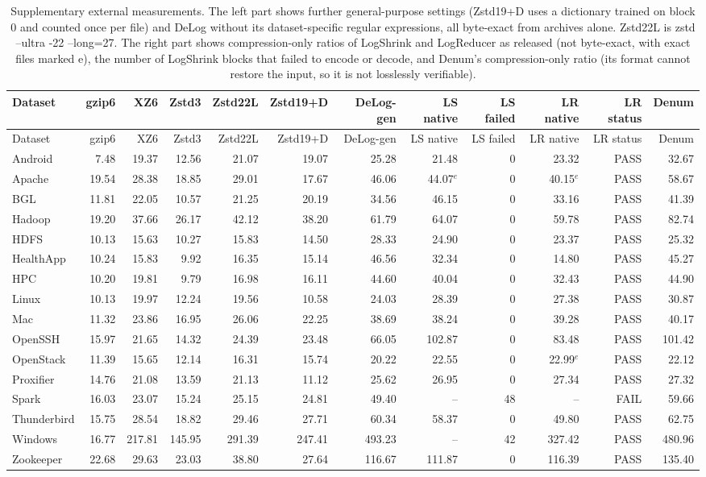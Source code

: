 \setlength{\tabcolsep}{2.5pt}
\begin{longtable}{lrrrrrrrrrrr}
\caption{Supplementary external measurements. The left part shows further general-purpose settings (Zstd19+D uses a dictionary trained on block 0 and counted once per file) and DeLog without its dataset-specific regular expressions, all byte-exact from archives alone. Zstd22L is zstd --ultra -22 --long=27. The right part shows compression-only ratios of LogShrink and LogReducer as released (not byte-exact, with exact files marked e), the number of LogShrink blocks that failed to encode or decode, and Denum\textquoteright s compression-only ratio (its format cannot restore the input, so it is not losslessly verifiable).}\label{tab:supp-external}\\
\toprule
Dataset & gzip6 & XZ6 & Zstd3 & Zstd22L & Zstd19+D & DeLog-gen & LS native & LS failed & LR native & LR status & Denum \\
\midrule\endfirsthead
\toprule
Dataset & gzip6 & XZ6 & Zstd3 & Zstd22L & Zstd19+D & DeLog-gen & LS native & LS failed & LR native & LR status & Denum \\
\midrule\endhead
Android & 7.48 & 19.37 & 12.56 & 21.07 & 19.07 & 25.28 & 21.48 & 0 & 23.32 & PASS & 32.67 \\
Apache & 19.54 & 28.38 & 18.85 & 29.01 & 17.67 & 46.06 & 44.07$^e$ & 0 & 40.15$^e$ & PASS & 58.67 \\
BGL & 11.81 & 22.05 & 10.57 & 21.25 & 20.19 & 34.56 & 46.15 & 0 & 33.16 & PASS & 41.39 \\
Hadoop & 19.20 & 37.66 & 26.17 & 42.12 & 38.20 & 61.79 & 64.07 & 0 & 59.78 & PASS & 82.74 \\
HDFS & 10.13 & 15.63 & 10.27 & 15.83 & 14.50 & 28.33 & 24.90 & 0 & 23.37 & PASS & 25.32 \\
HealthApp & 10.24 & 15.83 & 9.92 & 16.35 & 15.14 & 46.56 & 32.34 & 0 & 14.80 & PASS & 45.27 \\
HPC & 10.20 & 19.81 & 9.79 & 16.98 & 16.11 & 44.60 & 40.04 & 0 & 32.43 & PASS & 44.90 \\
Linux & 10.13 & 19.97 & 12.24 & 19.56 & 10.58 & 24.03 & 28.39 & 0 & 27.38 & PASS & 30.87 \\
Mac & 11.32 & 23.86 & 16.95 & 26.06 & 22.25 & 38.69 & 38.24 & 0 & 39.28 & PASS & 40.17 \\
OpenSSH & 15.97 & 21.65 & 14.32 & 24.39 & 23.48 & 66.05 & 102.87 & 0 & 83.48 & PASS & 101.42 \\
OpenStack & 11.39 & 15.65 & 12.14 & 16.31 & 15.74 & 20.22 & 22.55 & 0 & 22.99$^e$ & PASS & 22.12 \\
Proxifier & 14.76 & 21.08 & 13.59 & 21.13 & 11.12 & 25.62 & 26.95 & 0 & 27.34 & PASS & 27.32 \\
Spark & 16.03 & 23.07 & 15.24 & 25.15 & 24.81 & 49.40 & -- & 48 & -- & FAIL & 59.66 \\
Thunderbird & 15.75 & 28.54 & 18.82 & 29.46 & 27.71 & 60.34 & 58.37 & 0 & 49.80 & PASS & 62.75 \\
Windows & 16.77 & 217.81 & 145.95 & 291.39 & 247.41 & 493.23 & -- & 42 & 327.42 & PASS & 480.96 \\
Zookeeper & 22.68 & 29.63 & 23.03 & 38.80 & 27.64 & 116.67 & 111.87 & 0 & 116.39 & PASS & 135.40 \\
\bottomrule
\end{longtable}
